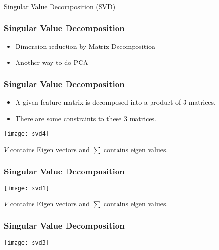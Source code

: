 \begin{frame}[fragile]\frametitle{}
\begin{center}
{\Large Singular Value Decomposition (SVD)}
\end{center}
\end{frame}


\begin{frame}[fragile]
\frametitle{Singular Value Decomposition}

\begin{itemize}
	\item Dimension reduction by Matrix Decomposition
	\item Another way to do PCA
\end{itemize}
\end{frame}

\begin{frame}[fragile]
\frametitle{Singular Value Decomposition}

\begin{itemize}
	\item A given feature matrix is decomposed into a product of 3 matrices.
	\item There are some constraints to these 3 matrices.
\end{itemize}
\begin{center}
\texttt{[image: svd4]}
\end{center}
$V$ contains Eigen vectors and $\sum$ contains eigen values.
\end{frame}

\begin{frame}[fragile]
\frametitle{Singular Value Decomposition}
\begin{center}
\texttt{[image: svd1]}
\end{center}
$V$ contains Eigen vectors and $\sum$ contains eigen values.
\end{frame}

\begin{frame}[fragile]
\frametitle{Singular Value Decomposition}
\begin{center}
\texttt{[image: svd3]}
\end{center}
\end{frame}



